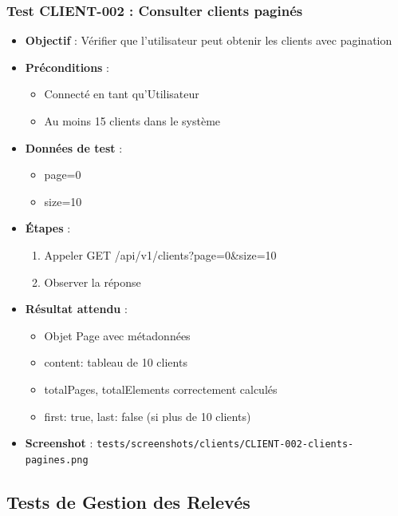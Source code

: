 \subsubsection{Test CLIENT-002 : Consulter clients paginés}
\begin{itemize}
    \item \textbf{Objectif} : Vérifier que l'utilisateur peut obtenir les clients avec pagination
    \item \textbf{Préconditions} : 
        \begin{itemize}
            \item Connecté en tant qu'Utilisateur
            \item Au moins 15 clients dans le système
        \end{itemize}
    \item \textbf{Données de test} :
        \begin{itemize}
            \item page=0
            \item size=10
        \end{itemize}
    \item \textbf{Étapes} :
        \begin{enumerate}
            \item Appeler GET /api/v1/clients?page=0\&size=10
            \item Observer la réponse
        \end{enumerate}
    \item \textbf{Résultat attendu} : 
        \begin{itemize}
            \item Objet Page avec métadonnées
            \item content: tableau de 10 clients
            \item totalPages, totalElements correctement calculés
            \item first: true, last: false (si plus de 10 clients)
        \end{itemize}
    \item \textbf{Screenshot} : \texttt{tests/screenshots/clients/CLIENT-002-clients-pagines.png}
\end{itemize}

\subsection{Tests de Gestion des Relevés}

